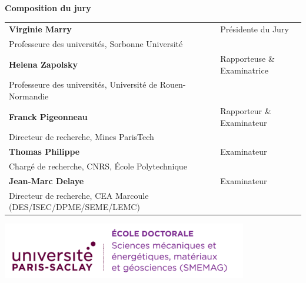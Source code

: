 {{\begin{titlepage}
        \flushleft
        \small \textbf{Composition du jury}\\
        \vspace{2mm}
        \scriptsize
        \begin{tabular}{|>{\raggedright\arraybackslash}p{9cm}l}
            \arrayrulecolor{Prune}
            \textbf{Virginie Marry}											& Présidente du Jury\\ 
            Professeure des universités, Sorbonne Université				& \\ 
            \textbf{Helena Zapolsky}										& Rapporteuse \& Examinatrice \\ 
            Professeure des universités, Université de Rouen-Normandie		& \\ 
            \textbf{Franck Pigeonneau}										& Rapporteur \& Examinateur \\ 
            Directeur de recherche, Mines ParisTech							& \\ 
            \textbf{Thomas Philippe} 										& Examinateur\\ 
            Chargé de recherche, CNRS, \'Ecole Polytechnique				& \\ 
            \textbf{Jean-Marc Delaye} 										& Examinateur\\ 
            Directeur de recherche, CEA Marcoule (DES/ISEC/DPME/SEME/LEMC)	&
            
        \end{tabular} 
        \vspace{5mm}
    \end{titlepage}


\thispagestyle{empty}

\noindent 
\includegraphics[height=2.45cm]{logo_usp_SMEMAG}
\vspace{0.1cm}
{ %
\footnotesize

}}}

